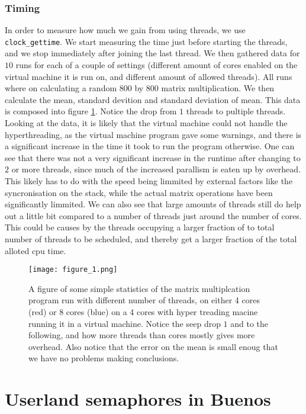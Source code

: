 \documentclass{article}
\begin{document}
\subsubsection{Timing}
In order to measure how much we gain from using threads, we use \texttt{clock\_gettime}. We start measuring the time just before starting the threads, and we stop immediately after joining the last thread. We then gathered data for $10$ runs for each of a couple of settings (different amount of cores enabled on the virtual machine it is run on, and different amount of allowed threads). All runs where on calculating a random $800$ by $800$ matrix multiplication. We then calculate the mean, standard devition and standard deviation of mean. This data is composed into figure \ref{fig:stat}. Notice the drop from $1$ threads to pultiple threads. Looking at the data, it is likely that the virtual machine could not handle the hyperthreading, as the virtual machine program gave some warnings, and there is a significant increase in the time it took to run the program otherwise. One can see that there was not a very significant increase in the runtime after changing to $2$ or more threads, since much of the increased parallism is eaten up by overhead. This likely has to do with the speed being limmited by external factors like the syncronisation on the stack, while the actual matrix operations have been significantly limmited. We can also see that large amounts of threads still do help out a little bit compared to a number of threads just around the number of cores. This could be causes by the threads occupying a larger fraction of to total number of threads to be scheduled, and thereby get a larger fraction of the total alloted cpu time.

\begin{figure}
\texttt{[image: figure\_1.png]}
\caption{A figure of some simple statistics of the matrix multiplcation program run with different number of threads, on either 4 cores (red) or 8 cores (blue) on a 4 cores with hyper treading macine running it in a virtual machine. Notice the seep drop $1$ and to the following, and how more threads than cores mostly gives more overhead. Also notice that the error on the mean is small enoug that we have no problems making conclusions.} 
\label{fig:stat}
\end{figure}

\section{Userland semaphores in Buenos}
\end{document}

